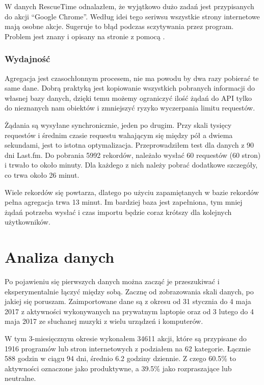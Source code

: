 \documentclass[openright]{xmgr}
\begin{document}
        W danych RescueTime odnalazłem, że wyjątkowo dużo zadań jest przypisanych do akcji ``Google Chrome''.
        Według idei tego seriwsu wszystkie strony internetowe mają osobne akcje. Sugeruje to błąd podczas sczytywania przez program.
        Problem jest znany i opisany na stronie z pomocą \cite{rescuetime:help-browser-time}.

        \subsection*{Wydajność}
        Agregacja jest czasochłonnym procesem, nie ma powodu by dwa razy pobierać te same dane.
        Dobrą praktyką jest kopiowanie wszystkich pobranych informacji do własnej bazy danych,
        dzięki temu możemy ograniczyć ilość żądań do API tylko do nieznanych nam obiektów i zmniejszyć ryzyko wyczerpania limitu requestów.

		Żądania są wysyłane synchronicznie, jeden po drugim.
		Przy skali tysięcy requestów i średnim czasie requestu wahającym się między pół a dwiema sekundami, jest to istotna optymalizacja.
		Przeprowadziłem test dla danych z 90 dni Last.fm. Do pobrania 5992 rekordów, należało wysłać 60 requestów (60 stron) i trwało to około minuty.
		Dla każdego z nich należy pobrać dodatkowe szczegóły, co trwa około 26 minut.

		Wiele rekordów się powtarza, dlatego po użyciu zapamiętanych w bazie rekordów pełna agregacja trwa 13 minut.
		Im bardziej baza jest zapełniona, tym mniej żądań potrzeba wysłać i czas importu będzie coraz krótszy dla kolejnych użytkowników.

\chapter{Analiza danych}

	Po pojawieniu się pierwszych danych można zacząć je przeszukiwać i eksperymentalnie łączyć między sobą.
	Zacznę od zobrazowania skali danych, po jakiej się poruszam.
	Zaimportowane dane są z okresu od 31 stycznia do 4 maja 2017 z aktywności wykonywanych na prywatnym laptopie
	oraz od 3 lutego do 4 maja 2017 ze słuchanej muzyki z wielu urządzeń i komputerów.

	W tym 3-miesięcznym okresie wykonałem 34611 akcji, które są przypisane do 1916 programów lub stron internetowych z podziałem na 62 kategorie.
	Łącznie 588 godzin w ciągu 94 dni, średnio 6.2 godziny dziennie.
	Z czego 60.5\% to aktywności oznaczone jako produktywne, a 39.5\% jako rozpraszające lub neutralne.
\end{document}

